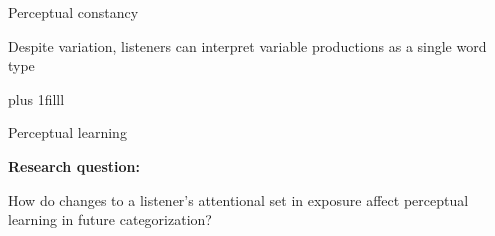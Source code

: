 \documentclass{beamer}
\newcommand{\btVFill}{\vskip0pt plus 1filll}
\begin{document}
\begin{frame}{Perceptual constancy}
\vfill
\begin{center}
Despite variation, listeners can interpret variable productions as a single word type
\vfill
{}

\end{center}
\btVFill

\begin{flushright}
\scriptsize
\citet{Shankweiler1977, Kuhl1979,Sumner2013}
\end{flushright}
\end{frame}

\begin{frame}{Perceptual learning}
\hfill
{}

\vfill
\textbf{Research question:}

How do changes to a listener's attentional set in exposure affect perceptual learning in future categorization?
\vfill

\end{frame}
\end{document}
